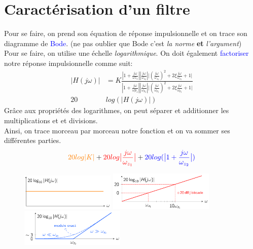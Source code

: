 \documentclass{report}
\begin{document}
\section{Caractérisation d'un filtre} \label{Bode}
Pour se faire, on prend son équation de réponse impulsionnelle et on trace son diagramme de \textcolor{blue}{Bode}. (ne pas oublier que Bode c'est \textit{la norme} \textbf{et} \textit{l'argument})\\

Pour se faire, on utilise une échelle \textit{logarithmique}. On doit également \textcolor{blue}{factoriser} notre réponse impulsionnelle comme suit:
\begin{align}
|H(j\omega)| &= K \frac{|1 + \frac{j\omega}{\omega{z_1}}||\frac{j\omega}{\omega_{z_2}}|\bigr|(\frac{j\omega}{\omega_{z_3}})^2 + 2 \xi \frac{j\omega}{\omega_{z_3}}+1\bigr|}{|1 + \frac{j\omega}{\omega{p_1}}||\frac{j\omega}{\omega_{p_2}}|\bigr|(\frac{j\omega}{\omega_{p_3}})^2 + 2 \xi \frac{j\omega}{\omega_{p_3}}+1\bigr|}\\
20 &log(|H(j\omega)|)
\end{align}
Grâce aux propriétés des logarithmes, on peut séparer et additionner les multiplications et et divisions.\\
Ainsi, on trace morceau par morceau notre fonction et on va sommer ses différentes parties.
\begin{align*}
\textcolor{orange}{20 log|K|} + \textcolor{red}{20 log \bigr| \frac{j\omega}{\omega_{z_1}}\bigr|} + \textcolor{blue}{20 log(\bigr|1 + \frac{j\omega}{\omega_{z_2}}\bigr|)}
\end{align*}

\begin{figure}[H]
\centering
\includegraphics[width=4.5cm]{img/K.png}
\includegraphics[width=5cm]{img/jomega.png}
\includegraphics[width=5cm]{img/jomegacarre.png}
\end{figure}
\end{document}
